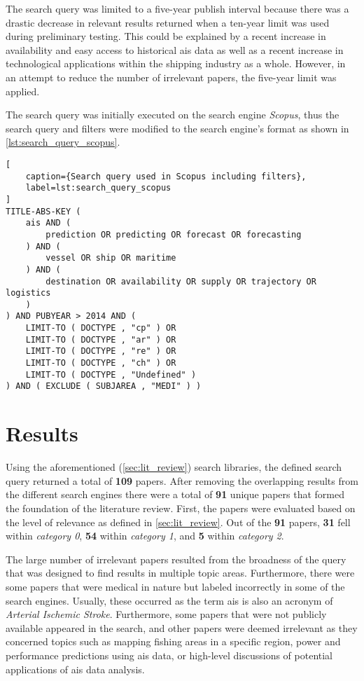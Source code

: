 The search query was limited to a five-year publish interval because there was a drastic decrease in relevant results returned when a ten-year limit was used during preliminary testing. This could be explained by a recent increase in availability and easy access to historical \acrshort{ais} data as well as a recent increase in technological applications within the shipping industry as a whole. However, in an attempt to reduce the number of irrelevant papers, the five-year limit was applied.

The search query was initially executed on the search engine \textit{Scopus}, thus the search query and filters were modified to the search engine's format as shown in \cref{lst:search_query_scopus}.

\begin{lstlisting}[
    caption={Search query used in Scopus including filters},
    label=lst:search_query_scopus
]
TITLE-ABS-KEY (
    ais AND (
        prediction OR predicting OR forecast OR forecasting
    ) AND (
        vessel OR ship OR maritime
    ) AND (
        destination OR availability OR supply OR trajectory OR logistics
    )
) AND PUBYEAR > 2014 AND (
    LIMIT-TO ( DOCTYPE , "cp" ) OR
    LIMIT-TO ( DOCTYPE , "ar" ) OR
    LIMIT-TO ( DOCTYPE , "re" ) OR
    LIMIT-TO ( DOCTYPE , "ch" ) OR
    LIMIT-TO ( DOCTYPE , "Undefined" )
) AND ( EXCLUDE ( SUBJAREA , "MEDI" ) )
\end{lstlisting}

\section{Results}
\label{sec:lit_results}

Using the aforementioned (\cref{sec:lit_review}) search libraries, the defined search query returned a total of \textbf{109} papers. After removing the overlapping results from the different search engines there were a total of \textbf{91} unique papers that formed the foundation of the literature review. First, the papers were evaluated based on the level of relevance as defined in \cref{sec:lit_review}. Out of the \textbf{91} papers, \textbf{31} fell within \textit{category 0}, \textbf{54} within \textit{category 1}, and \textbf{5} within \textit{category 2}.

The large number of irrelevant papers resulted from the broadness of the query that was designed to find results in multiple topic areas. Furthermore, there were some papers that were medical in nature but labeled incorrectly in some of the search engines. Usually, these occurred as the term \acrshort{ais} is also an acronym of \textit{Arterial Ischemic Stroke}. Furthermore, some papers that were not publicly available appeared in the search, and other papers were deemed irrelevant as they concerned topics such as mapping fishing areas in a specific region, power and performance predictions using \acrshort{ais} data, or high-level discussions of potential applications of \acrshort{ais} data analysis.

